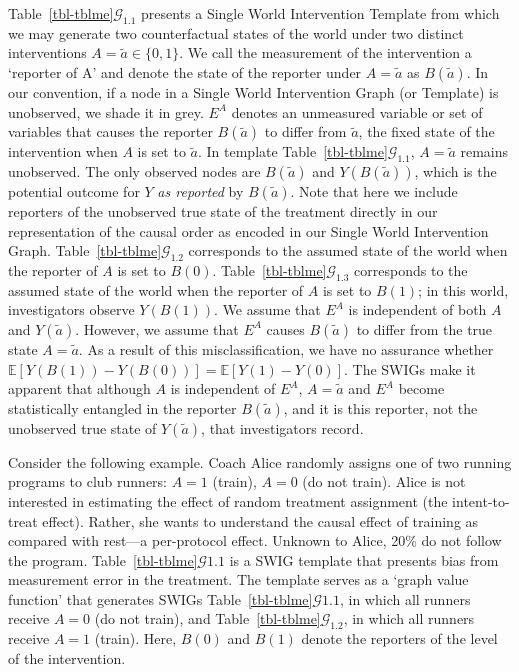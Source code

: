 \documentclass[
  single column]{article}
\begin{document}
Table~\ref{tbl-tblme}\(\mathcal{G}_{1.1}\) presents a Single World
Intervention Template from which we may generate two counterfactual
states of the world under two distinct interventions
\(A = \tilde{a} \in \{0,1\}\). We call the measurement of the
intervention a `reporter of A' and denote the state of the reporter
under \(A = \tilde{a}\) as \(B(\tilde{a})\). In our convention, if a
node in a Single World Intervention Graph (or Template) is unobserved,
we shade it in grey. \(E^A\) denotes an unmeasured variable or set of
variables that causes the reporter \(B(\tilde{a})\) to differ from
\(\tilde{a}\), the fixed state of the intervention when \(A\) is set to
\(\tilde{a}\). In template Table~\ref{tbl-tblme}\(\mathcal{G}_{1.1}\),
\(A = \tilde{a}\) remains unobserved. The only observed nodes are
\(B(\tilde{a})\) and \(Y(B(\tilde{a}))\), which is the potential outcome
for \(Y\) \emph{as reported} by \(B(\tilde{a})\). Note that here we
include reporters of the unobserved true state of the treatment directly
in our representation of the causal order as encoded in our Single World
Intervention Graph. Table~\ref{tbl-tblme}\(\mathcal{G}_{1.2}\)
corresponds to the assumed state of the world when the reporter of \(A\)
is set to \(B(0)\). Table~\ref{tbl-tblme}\(\mathcal{G}_{1.3}\)
corresponds to the assumed state of the world when the reporter of \(A\)
is set to \(B(1)\); in this world, investigators observe \(Y(B(1))\). We
assume that \(E^A\) is independent of both \(A\) and \(Y(\tilde{a})\).
However, we assume that \(E^A\) causes \(B(\tilde{a})\) to differ from
the true state \(A=\tilde{a}\). As a result of this misclassification,
we have no assurance whether
\(\mathbb{E}[Y(B(1)) - Y(B(0))] = \mathbb{E}[Y(1) - Y(0)]\). The SWIGs
make it apparent that although \(A\) is independent of \(E^A\),
\(A = \tilde{a}\) and \(E^A\) become statistically entangled in the
reporter \(B(\tilde{a})\), and it is this reporter, not the unobserved
true state of \(Y(\tilde{a})\), that investigators record.

Consider the following example. Coach Alice randomly assigns one of two
running programs to club runners: \(A = 1\) (train), \(A = 0\) (do not
train). Alice is not interested in estimating the effect of random
treatment assignment (the intent-to-treat effect). Rather, she wants to
understand the causal effect of training as compared with rest---a
per-protocol effect. Unknown to Alice, 20\% do not follow the program.
Table~\ref{tbl-tblme}\(\mathcal{G}{1.1}\) is a SWIG template that
presents bias from measurement error in the treatment. The template
serves as a `graph value function' that generates SWIGs
Table~\ref{tbl-tblme}\(\mathcal{G}{1.1}\), in which all runners receive
\(A = 0\) (do not train), and
Table~\ref{tbl-tblme}\(\mathcal{G}_{1.2}\), in which all runners receive
\(A = 1\) (train). Here, \(B(0)\) and \(B(1)\) denote the reporters of
the level of the intervention.
\end{document}

